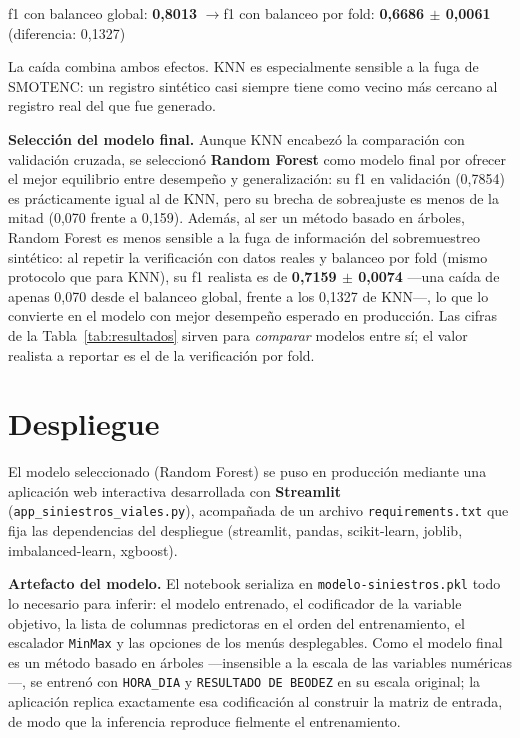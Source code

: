 \documentclass[11pt]{article}
\newcommand{\vartxt}[1]{\texttt{#1}}
\begin{document}
\begin{center}
f1 con balanceo global: \textbf{0,8013} \quad$\rightarrow$\quad f1 con balanceo por fold: \textbf{0,6686 $\pm$ 0,0061} \quad(diferencia: 0,1327)
\end{center}

La caída combina ambos efectos. KNN es especialmente sensible a la fuga de SMOTENC: un registro sintético casi siempre tiene como vecino más cercano al registro real del que fue generado.

\textbf{Selección del modelo final.} Aunque KNN encabezó la comparación con validación cruzada, se seleccionó \textbf{Random Forest} como modelo final por ofrecer el mejor equilibrio entre desempeño y generalización: su f1 en validación (0,7854) es prácticamente igual al de KNN, pero su brecha de sobreajuste es menos de la mitad (0,070 frente a 0,159). Además, al ser un método basado en árboles, Random Forest es menos sensible a la fuga de información del sobremuestreo sintético: al repetir la verificación con datos reales y balanceo por fold (mismo protocolo que para KNN), su f1 realista es de \textbf{0,7159 $\pm$ 0,0074} ---una caída de apenas 0,070 desde el balanceo global, frente a los 0,1327 de KNN---, lo que lo convierte en el modelo con mejor desempeño esperado en producción. Las cifras de la Tabla~\ref{tab:resultados} sirven para \emph{comparar} modelos entre sí; el valor realista a reportar es el de la verificación por fold.

\section{Despliegue}
\label{sec:despliegue}

El modelo seleccionado (Random Forest) se puso en producción mediante una aplicación web interactiva desarrollada con \textbf{Streamlit} (\vartxt{app\_siniestros\_viales.py}), acompañada de un archivo \vartxt{requirements.txt} que fija las dependencias del despliegue (streamlit, pandas, scikit-learn, joblib, imbalanced-learn, xgboost).

\textbf{Artefacto del modelo.} El notebook serializa en \vartxt{modelo-siniestros.pkl} todo lo necesario para inferir: el modelo entrenado, el codificador de la variable objetivo, la lista de columnas predictoras en el orden del entrenamiento, el escalador \vartxt{MinMax} y las opciones de los menús desplegables. Como el modelo final es un método basado en árboles ---insensible a la escala de las variables numéricas---, se entrenó con \vartxt{HORA\_DIA} y \vartxt{RESULTADO DE BEODEZ} en su escala original; la aplicación replica exactamente esa codificación al construir la matriz de entrada, de modo que la inferencia reproduce fielmente el entrenamiento.
\end{document}
